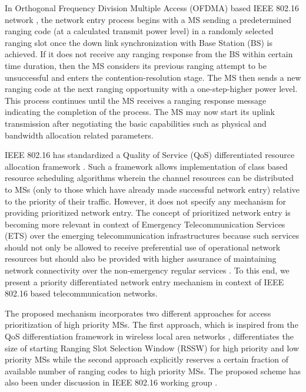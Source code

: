 \documentclass[preprint,12pt]{elsarticle}
\begin{document}
In Orthogonal Frequency Division Multiple Access (OFDMA) based IEEE 802.16 network \cite{standard}, the network entry process begins with a MS sending a predetermined ranging code (at a calculated transmit power level) in a randomly selected ranging slot once the down link synchronization with Base Station (BS) is achieved. If it does not receive any ranging response from the BS within certain time duration, then the MS considers its previous ranging attempt to be unsuccessful and enters the contention-resolution stage. The MS then sends a new ranging code at the next ranging opportunity with a one-step-higher power level. This process continues until the MS receives a ranging response message indicating the completion of the process. The MS may now start its uplink transmission after negotiating the basic capabilities such as physical and bandwidth allocation related parameters.

IEEE 802.16 has standardized a Quality of Service (QoS) differentiated resource allocation framework \cite{Cicconetti} \cite{Zhang}. Such a framework allows implementation of class based resource scheduling algorithms wherein the channel resources can be distributed to MSs (only to those which have already made successful network entry) relative to the priority of their traffic. However, it does not specify any mechanism for providing prioritized network entry. The concept of prioritized network entry is becoming more relevant in context of Emergency Telecommunication Services (ETS) over the emerging telecommunication infrastructures because such services should not only be allowed to receive preferential use of operational network resources but should also be provided with higher assurance of maintaining network connectivity over the non-emergency regular services \cite{Folts}\cite{Boone}. To this end, we present a priority differentiated network entry mechanism in context of IEEE 802.16 based telecommunication networks.

The proposed mechanism incorporates two different approaches for access prioritization of high priority MSs. The first approach, which is inspired from the QoS differentiation framework in wireless local area networks \cite{Zhu}, differentiates the size of starting Ranging Slot Selection Window (RSSW) for high priority and low priority MSs while the second approach explicitly reserves a certain fraction of available number of ranging codes to high priority MSs. The proposed scheme has also been under discussion in IEEE 802.16 working group \cite{weblink}.
\end{document}
